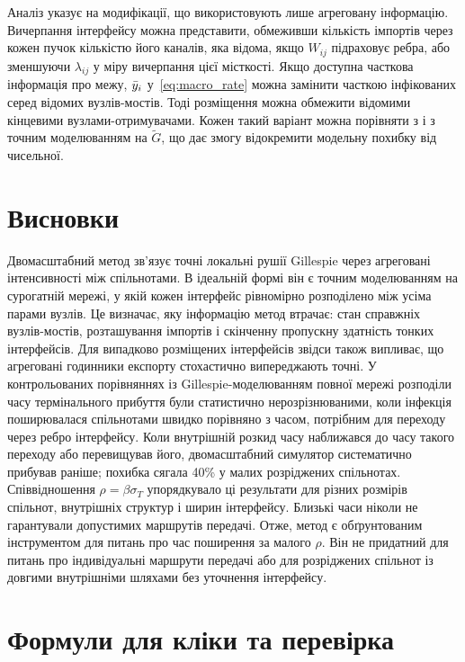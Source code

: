Аналіз указує на модифікації, що використовують лише агреговану інформацію. Вичерпання інтерфейсу можна представити, обмеживши кількість імпортів через кожен пучок кількістю його каналів, яка відома, якщо $W_{ij}$ підраховує ребра, або зменшуючи $\lambda_{ij}$ у міру вичерпання цієї місткості. Якщо доступна часткова інформація про межу, $\bar{y}_i$ у~\eqref{eq:macro_rate} можна замінити часткою інфікованих серед відомих вузлів-мостів. Тоді розміщення можна обмежити відомими кінцевими вузлами-отримувачами. Кожен такий варіант можна порівняти з \Full{} і з точним моделюванням на $\tilde G$, що дає змогу відокремити модельну похибку від чисельної.

\section{Висновки}
\label{sec:conclusions}

Двомасштабний метод зв'язує точні локальні рушії Gillespie через агреговані інтенсивності між спільнотами. В ідеальній формі він є точним моделюванням на сурогатній мережі, у якій кожен інтерфейс рівномірно розподілено між усіма парами вузлів. Це визначає, яку інформацію метод втрачає: стан справжніх вузлів-мостів, розташування імпортів і скінченну пропускну здатність тонких інтерфейсів. Для випадково розміщених інтерфейсів звідси також випливає, що агреговані годинники експорту стохастично випереджають точні. У контрольованих порівняннях із Gillespie-моделюванням повної мережі розподіли часу термінального прибуття були статистично нерозрізнюваними, коли інфекція поширювалася спільнотами швидко порівняно з часом, потрібним для переходу через ребро інтерфейсу. Коли внутрішній розкид часу наближався до часу такого переходу або перевищував його, двомасштабний симулятор систематично прибував раніше; похибка сягала 40\% у малих розріджених спільнотах. Співвідношення $\rho=\beta\sigma_T$ упорядкувало ці результати для різних розмірів спільнот, внутрішніх структур і ширин інтерфейсу. Близькі часи ніколи не гарантували допустимих маршрутів передачі. Отже, метод є обґрунтованим інструментом для питань про час поширення за малого $\rho$. Він не придатний для питань про індивідуальні маршрути передачі або для розріджених спільнот із довгими внутрішніми шляхами без уточнення інтерфейсу.

\appendix

\section{Формули для кліки та перевірка}
\label{app:clique}

